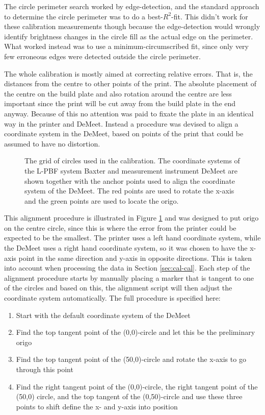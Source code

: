 The circle perimeter search worked by edge-detection, and the standard approach to determine the circle perimeter was to do a best-$R^2$-fit. This didn't work for these calibration measurements though because the edge-detection would wrongly identify brightness changes in the circle fill as the actual edge on the perimeter. What worked instead was to use a minimum-circumscribed fit, since only very few erroneous edges were detected outside the circle perimeter.

The whole calibration is mostly aimed at correcting relative errors. That is, the distances from the centre to other points of the print. The absolute placement of the centre on the build plate and also rotation around the centre are less important since the print will be cut away from the build plate in the end anyway. Because of this no attention was paid to fixate the plate in an identical way in the printer and DeMeet. Instead a procedure was devised to align a coordinate system in the DeMeet, based on points of the print that could be assumed to have no distortion.

\begin{figure}
    \centering
    
    \caption{The grid of circles used in the calibration. The coordinate systems of the L-PBF system Baxter and measurement instrument DeMeet are shown together with the anchor points used to align the coordinate system of the DeMeet. The red points are used to rotate the x-axis and the green points are used to locate the origo.}
    \label{fig:calibration-grid}
\end{figure}

This alignment procedure is illustrated in Figure \ref{fig:calibration-grid} and was designed to put origo on the centre circle, since this is where the error from the printer could be expected to be the smallest. The printer uses a left hand coordinate system, while the DeMeet uses a right hand coordinate system, so it was chosen to have the x-axis point in the same direction and y-axis in opposite directions. This is taken into account when processing the data in Section \ref{sec:cal-cal}. Each step of the alignment procedure starts by manually placing a marker that is tangent to one of the circles and based on this, the alignment script will then adjust the coordinate system automatically. The full procedure is specified here:

\begin{enumerate}
    \item Start with the default coordinate system of the DeMeet
    \item Find the top tangent point of the (0,0)-circle and let this be the preliminary origo
    \item Find the top tangent point of the (50,0)-circle and rotate the x-axis to go through this point
    \item Find the right tangent point of the (0,0)-circle, the right tangent point of the (50,0) circle, and the top tangent of the (0,50)-circle and use these three points to shift define the x- and y-axis into position
\end{enumerate}


